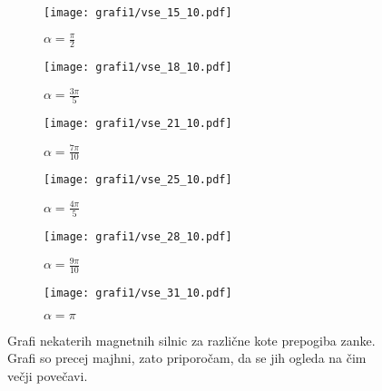 \documentclass[12pt, a4paper]{article}
\begin{document}
\begin{figure}
  \centering
  \begin{subfigure}[b]{0.49\textwidth}
    \centering
    \texttt{[image: grafi1/vse\_15\_10.pdf]}
    \caption{$\alpha = \frac{\pi}{2}$}
    \label{graf}
  \end{subfigure}
  \begin{subfigure}[b]{0.49\textwidth}
    \centering
    \texttt{[image: grafi1/vse\_18\_10.pdf]}
    \caption{$\alpha = \frac{3\pi}{5}$}
    \label{graf}
  \end{subfigure}
  \begin{subfigure}[b]{0.49\textwidth}
    \centering
    \texttt{[image: grafi1/vse\_21\_10.pdf]}
    \caption{$\alpha = \frac{7\pi}{10}$}
    \label{graf}
  \end{subfigure}
  \begin{subfigure}[b]{0.49\textwidth}
    \centering
    \texttt{[image: grafi1/vse\_25\_10.pdf]}
    \caption{$\alpha = \frac{4\pi}{5}$}
    \label{graf}
  \end{subfigure}
  \begin{subfigure}[b]{0.49\textwidth}
    \centering
    \texttt{[image: grafi1/vse\_28\_10.pdf]}
    \caption{$\alpha = \frac{9\pi}{10}$}
    \label{graf}
  \end{subfigure}
  \begin{subfigure}[b]{0.49\textwidth}
    \centering
    \texttt{[image: grafi1/vse\_31\_10.pdf]}
    \caption{$\alpha = \pi$}
    \label{graf}
  \end{subfigure}
  \caption{Grafi nekaterih magnetnih silnic za različne kote prepogiba zanke. Grafi so precej majhni, zato priporočam, da se jih ogleda na čim večji povečavi.}
\end{figure}
\pagebreak
\end{document}
